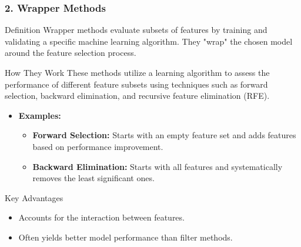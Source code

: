 \documentclass{beamer}
\begin{document}
\begin{frame}[fragile]
    \frametitle{2. Wrapper Methods}
    \begin{block}{Definition}
        Wrapper methods evaluate subsets of features by training and validating a specific machine learning algorithm. They "wrap" the chosen model around the feature selection process.
    \end{block}

    \begin{block}{How They Work}
        These methods utilize a learning algorithm to assess the performance of different feature subsets using techniques such as forward selection, backward elimination, and recursive feature elimination (RFE).
    \end{block}

    \begin{itemize}
        \item \textbf{Examples:}
        \begin{itemize}
            \item \textbf{Forward Selection:} Starts with an empty feature set and adds features based on performance improvement.
            \item \textbf{Backward Elimination:} Starts with all features and systematically removes the least significant ones.
        \end{itemize}
    \end{itemize}

    \begin{block}{Key Advantages}
        \begin{itemize}
            \item Accounts for the interaction between features.
            \item Often yields better model performance than filter methods.
        \end{itemize}
    \end{block}
\end{frame}
\end{document}
